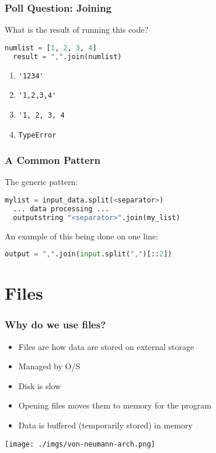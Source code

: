 \documentclass{beamer}
\begin{document}
%
%
\begin{frame}[fragile]
  \frametitle{Poll Question: Joining}
  What is the result of running this code?
  \begin{lstlisting}[language=Python, autogobble]
  numlist = [1, 2, 3, 4]
  result = ",".join(numlist)
  \end{lstlisting}
  \vfill
  \begin{enumerate}[A]
    \item \lstinline|'1234'|
    \item \lstinline|'1,2,3,4'|
    \item \lstinline|'1, 2, 3, 4|
    \item \lstinline|TypeError|
  \end{enumerate}
\end{frame}


%
%
\begin{frame}[fragile]
  \frametitle{A Common Pattern}
  The generic pattern:
  \begin{lstlisting}[language=Python, autogobble]
  mylist = input_data.split(<separator>)
  ... data processing ...
  outputstring "<separator>".join(my_list)
  \end{lstlisting}
  \vfill
  An example of this being done on one line:
  \begin{lstlisting}[language=Python, autogobble]
  output = ",".join(input.split(",")[::2])
  \end{lstlisting}
\end{frame}
\section{Files}
%
%
\begin{frame}[fragile]
  \frametitle{Why do we use files?}
  \begin{minipage}{0.48\textwidth}
    \begin{itemize}
      \item Files are how data are stored on external storage
      \item Managed by O/S
      \item Disk is slow
      \item Opening files moves them to memory for the program
      \item Data is buffered (temporarily stored) in memory
    \end{itemize}
  \end{minipage}
  \hfill
  \begin{minipage}{0.48\textwidth}
    \centering
    \texttt{[image: ./imgs/von-neumann-arch.png]}
    \vfill
  \end{minipage}
\end{frame}
\end{document}
